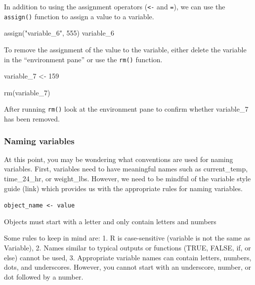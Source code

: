 \documentclass[
  letterpaper,
  DIV=11,
  numbers=noendperiod]{scrreprt}
\newenvironment{Shaded}{}{}
\newcommand{\DecValTok}[1]{\textcolor[rgb]{0.00,0.36,0.77}{#1}}
\newcommand{\FunctionTok}[1]{\textcolor[rgb]{0.44,0.26,0.76}{#1}}
\newcommand{\NormalTok}[1]{\textcolor[rgb]{0.14,0.16,0.18}{#1}}
\newcommand{\OtherTok}[1]{\textcolor[rgb]{0.44,0.26,0.76}{#1}}
\newcommand{\StringTok}[1]{\textcolor[rgb]{0.01,0.18,0.38}{#1}}
\begin{document}
In addition to using the assignment operators (\texttt{\textless{}-} and
\texttt{=}), we can use the \texttt{assign()} function to assign a value
to a variable.

\begin{Shaded}
\begin{Highlighting}[]
\FunctionTok{assign}\NormalTok{(}\StringTok{"variable\_6"}\NormalTok{, }\DecValTok{555}\NormalTok{)}
\NormalTok{variable\_6}
\end{Highlighting}
\end{Shaded}

To remove the assignment of the value to the variable, either delete the
variable in the ``environment pane'' or use the \texttt{rm()} function.

\begin{Shaded}
\begin{Highlighting}[]
\NormalTok{variable\_7 }\OtherTok{\textless{}{-}} \DecValTok{159}
\end{Highlighting}
\end{Shaded}

\begin{Shaded}
\begin{Highlighting}[]
\FunctionTok{rm}\NormalTok{(variable\_7)}
\end{Highlighting}
\end{Shaded}

After running \texttt{rm()} look at the environment pane to confirm
whether variable\_7 has been removed.

\subsubsection{Naming variables}\label{naming-variables}

At this point, you may be wondering what conventions are used for naming
variables. First, variables need to have meaningful names such as
current\_temp, time\_24\_hr, or weight\_lbs. However, we need to be
mindful of the variable style guide (link) which provides us with the
appropriate rules for naming variables.

\texttt{object\_name\ \textless{}-\ value}

Objects must start with a letter and only contain letters and numbers

Some rules to keep in mind are: 1. R is case-sensitive (variable is not
the same as Variable), 2. Names similar to typical outputs or functions
(TRUE, FALSE, if, or else) cannot be used, 3. Appropriate variable names
can contain letters, numbers, dots, and underscores. However, you cannot
start with an underscore, number, or dot followed by a number.
\end{document}
